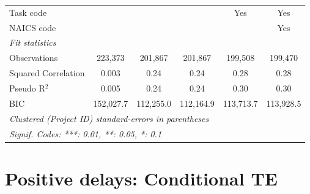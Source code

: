 \documentclass[
]{article}
\begin{document}
\begin{table}[htbp]
\begin{tabular}{lccccc}
      Task code                    &               &               &               & Yes           & Yes\\  
      NAICS code                   &               &               &               &               & Yes\\  
      \midrule
      \emph{Fit statistics}\\
      Observations                 & 223,373       & 201,867       & 201,867       & 199,508       & 199,470\\  
      Squared Correlation          & 0.003         & 0.24          & 0.24          & 0.28          & 0.28\\  
      Pseudo R$^2$                 & 0.005         & 0.24          & 0.24          & 0.30          & 0.30\\  
      BIC                          & 152,027.7     & 112,255.0     & 112,164.9     & 113,713.7     & 113,928.5\\  
      \midrule \midrule
      \multicolumn{6}{l}{\emph{Clustered (Project ID) standard-errors in parentheses}}\\
      \multicolumn{6}{l}{\emph{Signif. Codes: ***: 0.01, **: 0.05, *: 0.1}}\\
   \end{tabular}
\end{table}

\hypertarget{positive-delays-conditional-te}{%
\section{Positive delays: Conditional
TE}\label{positive-delays-conditional-te}}
\end{document}
